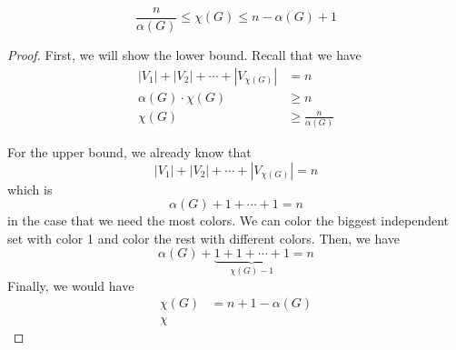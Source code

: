 \begin{theorem}
  \[ \frac{n}{\alpha(G)} \leq \chi(G) \leq n - \alpha(G) + 1 \]
\end{theorem}

\begin{proof}
  First, we will show the lower bound. Recall that we have
  \[
    \begin{aligned}
      |V_1| + |V_2| + \cdots + |V_{\chi(G)}| &= n \\
      \alpha(G) \cdot \chi(G) &\geq n \\
      \chi(G) &\geq \frac{n}{\alpha(G)}
    \end{aligned}
  \]

  For the upper bound, we already know that 
  \[ |V_1| + |V_2| + \cdots + |V_{\chi(G)}| = n \]
  which is 
  \[ \alpha(G) + 1 + \cdots + 1 = n \]
  in the case that we need the most colors.
  We can color the biggest independent set with color 1 and color
  the rest with different colors. Then, we have
  \[ \alpha(G) + \underbrace{1+1 + \cdots + 1}_{\chi(G)-1} = n \]
  Finally, we would have
  \[
    \begin{aligned}
      \chi(G) &= n + 1 - \alpha(G) \\
      \chi
    \end{aligned}
  \]
\end{proof}


